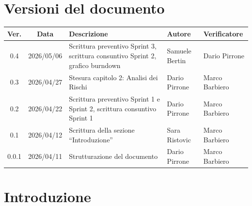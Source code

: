 \documentclass[12pt, a4paper]{article}
\begin{document}
\newpage

\section*{Versioni del documento}
\begin{table}[H]
    \centering
    \renewcommand{\arraystretch}{1.3}
    \begin{tabularx}{\textwidth}{|c|c|X|l|l|}
        \hline
        \textbf{Ver.} & \textbf{Data} & \textbf{Descrizione} & \textbf{Autore} & \textbf{Verificatore} \\ \hline
        0.4 & 2026/05/06 & Scrittura preventivo Sprint 3, scrittura consuntivo Sprint 2, grafico burndown & Samuele Bertin & Dario Pirrone \\ \hline
        0.3 & 2026/04/27 & Stesura capitolo 2: Analisi dei Rischi & Dario Pirrone & Marco Barbiero \\ \hline
        0.2 & 2026/04/22 & Scrittura preventivo Sprint 1 e Sprint 2, scrittura consuntivo Sprint 1 & Dario Pirrone & Marco Barbiero \\ \hline
        0.1 & 2026/04/12 & Scrittura della sezione ``Introduzione'' & Sara Ristovic & Marco Barbiero \\ \hline
        0.0.1 & 2026/04/11 & Strutturazione del documento & Dario Pirrone & Marco Barbiero \\ \hline
    \end{tabularx}
\end{table}

\newpage


\tableofcontents
\iftotaltables  %
    \vspace{1cm}
    \listoftables
\fi

\iftotalfigures
    \vspace{1cm}
    \listoffigures
\fi
\newpage


\section{Introduzione}
\end{document}
